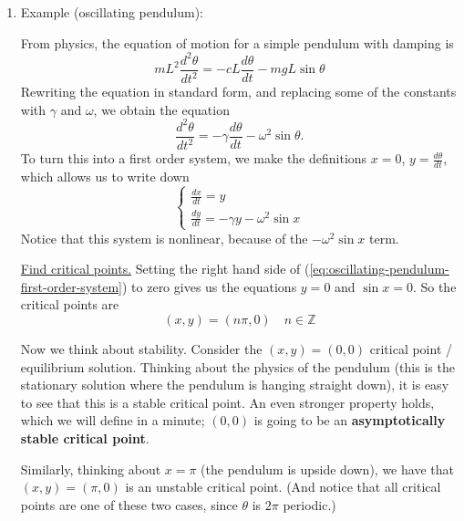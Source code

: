 \documentclass[11pt, letterpaper, oneside]{article}     %
\numberwithin{equation}{subsection}
\theoremstyle{definition}
\numberwithin{theorem}{section}
\theoremstyle{remark}
\newcommand{\ZZ}{\mathbb{Z}}
\newcommand{\ds}{\displaystyle}
\begin{document}
\begin{enumerate}
\item Example (oscillating pendulum):

  From physics, the equation of motion for a simple pendulum with damping is
  \begin{equation}\label{eq:oscillating-pendulum-eq-of-motion}
    mL^2\frac{d^2\theta}{dt^2} = -cL\frac{d\theta}{dt} - mgL\sin\theta
  \end{equation}
  Rewriting the equation in standard form, and replacing some of the constants with $\gamma$ and $\omega$, we obtain the equation
  \begin{equation}
    \frac{d^2\theta}{dt^2} = -\gamma\frac{d\theta}{dt} - \omega^2\sin\theta.
  \end{equation}
  To turn this into a first order system, we make the definitions $x = 0$, $\ds y = \frac{d\theta}{dt}$, which allows us to write down
  \begin{equation}\label{eq:oscillating-pendulum-first-order-system}
    \begin{cases}
      \frac{dx}{dt} = y\\
      \frac{dy}{dt} = -\gamma y - \omega^2\sin x
    \end{cases}
  \end{equation}
  Notice that this system is nonlinear, because of the $-\omega^2\sin x$ term.

  \underline{Find critical points.} Setting the right hand side of (\ref{eq:oscillating-pendulum-first-order-system}) to zero gives us the equations $y = 0$ and $\sin x = 0$. So the critical points are
  \begin{equation}\label{eq:oscillating-pendulum-crit-points}
    (x,y) = (n\pi,0)\quad n \in \ZZ
  \end{equation}

  Now we think about stability. Consider the $(x,y) = (0,0)$ critical point / equilibrium solution. Thinking about the physics of the pendulum (this is the stationary solution where the pendulum is hanging straight down), it is easy to see that this is a stable critical point. An even stronger property holds, which we will define in a minute; $(0,0)$ is going to be an \textbf{asymptotically stable critical point}.

  Similarly, thinking about $x = \pi$ (the pendulum is upside down), we have that $(x,y)=(\pi,0)$ is an unstable critical point. (And notice that all critical points are one of these two cases, since $\theta$ is $2\pi$ periodic.)


\end{enumerate}
\end{document}

